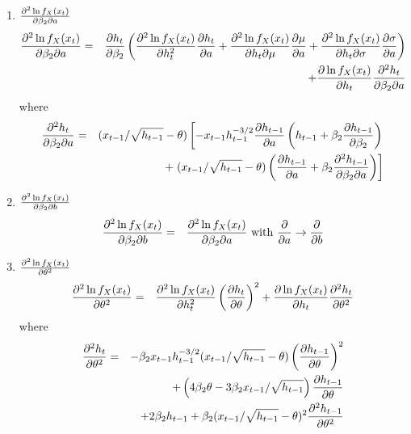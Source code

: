 \documentclass{book}
\begin{document}
\begin{enumerate}
\item $\frac{\partial^2 \ln f_X(x_t)}{\partial \beta_2 \partial a}$
  \begin{eqnarray*}
    \frac{\partial^2 \ln f_X(x_t)}{\partial \beta_2 \partial a} &=&
    \frac{\partial h_t}{\partial \beta_2} \left(
      \frac{\partial^2 \ln f_X(x_t)}{\partial h_t^2} \frac{\partial h_t}{\partial a}
      + \frac{\partial^2 \ln f_X(x_t)}{\partial h_t \partial \mu} \frac{\partial \mu}{\partial a}
      + \frac{\partial^2 \ln f_X(x_t)}{\partial h_t \partial \sigma} \frac{\partial \sigma}{\partial a}
    \right) \\
    &&
    + \frac{\partial \ln f_X(x_t)}{\partial h_t}\frac{\partial^2 h_t}{\partial \beta_2 \partial a}
  \end{eqnarray*}
  where
  \begin{eqnarray*}
    \frac{\partial^2 h_t}{\partial \beta_2 \partial a} &=&
    (x_{t-1}/\sqrt{h_{t-1}} - \theta) \left[
      -x_{t-1} h_{t-1}^{-3/2} \frac{\partial h_{t-1}}{\partial a} \left(
        h_{t-1} + \beta_2 \frac{\partial h_{t-1}}{\partial \beta_2} \right) \right.\\
    && +\left. (x_{t-1}/\sqrt{h_{t-1}} - \theta) \left(
        \frac{\partial h_{t-1}}{\partial a} + \beta_2 \frac{\partial^2 h_{t-1}}{\partial \beta_2 \partial a}
      \right) \right]
  \end{eqnarray*}

\item $\frac{\partial^2 \ln f_X(x_t)}{\partial \beta_2 \partial b}$
  \begin{eqnarray*}
    \frac{\partial^2 \ln f_X(x_t)}{\partial \beta_2 \partial b} &=& \frac{\partial^2 \ln f_X(x_t)}{\partial \beta_2 \partial a}
    \text{ with } \frac{\partial}{\partial a} \to \frac{\partial}{\partial b}
  \end{eqnarray*}

\item $\frac{\partial^2 \ln f_X(x_t)}{\partial \theta^2}$
  \begin{eqnarray*}
    \frac{\partial^2 \ln f_X(x_t)}{\partial \theta^2} &=&
    \frac{\partial^2 \ln f_X(x_t)}{\partial h_t^2} \left(\frac{\partial h_t}{\partial \theta}\right)^2
    + \frac{\partial \ln f_X(x_t)}{\partial h_t} \frac{\partial^2 h_t}{\partial \theta^2}
  \end{eqnarray*}
  where
  \begin{eqnarray*}
    \frac{\partial^2 h_t}{\partial \theta^2} &=&
    -\beta_2 x_{t-1} h_{t-1}^{-3/2}
    (x_{t-1} / \sqrt{h_{t-1}} - \theta)
    \left(
      \frac{\partial h_{t-1}}{\partial \theta}
    \right)^2 \\
    && + \left(
      4\beta_2\theta - 3\beta_2 x_{t-1}/\sqrt{h_{t-1}}
    \right) \frac{\partial h_{t-1}}{\partial \theta} \\
    &&
    + 2\beta_2 h_{t-1}
    + \beta_2 (x_{t-1} / \sqrt{h_{t-1}} - \theta)^2
    \frac{\partial^2 h_{t-1}}{\partial \theta^2}
  \end{eqnarray*}


\end{enumerate}
\end{document}
